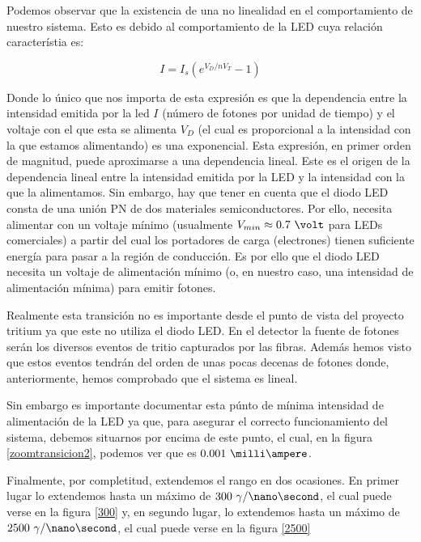 Podemos observar que la existencia de una no linealidad en el comportamiento de nuestro sistema. Esto es debido al comportamiento de la LED cuya relación característia es:

\begin{equation}
I=I_s(e^{V_D/{nV_T}}-1)
\label{LED}
\end{equation}

Donde lo único que nos importa de esta expresión es que la dependencia entre la intensidad emitida por la led $I$ (número de fotones por unidad de tiempo) y el voltaje con el que esta se alimenta $V_D$ (el cual es proporcional a la intensidad con la que estamos alimentando) es una exponencial. Esta expresión, en primer orden de magnitud, puede aproximarse a una dependencia lineal. Este es el origen de la dependencia lineal entre la intensidad emitida por la LED y la intensidad con la que la alimentamos. Sin embargo, hay que tener en cuenta que el diodo LED consta de una unión PN de dos materiales semiconductores. Por ello, necesita alimentar con un voltaje mínimo (usualmente $V_{min}\approx 0.7~\volt$ para LEDs comerciales) a partir del cual los portadores de carga (electrones) tienen suficiente energía para pasar a la región de conducción. Es por ello que el diodo LED necesita un voltaje de alimentación mínimo (o, en nuestro caso, una intensidad de alimentación  mínima) para emitir fotones.

Realmente esta transición no es importante desde el punto de vista del proyecto tritium ya que este no utiliza el diodo LED. En el detector la fuente de fotones serán los diversos eventos de tritio capturados por las fibras. Además hemos visto que estos eventos tendrán del orden de unas pocas decenas de fotones donde, anteriormente, hemos comprobado que el sistema es lineal. 

Sin embargo es importante documentar esta púnto de mínima intensidad de alimentación de la LED ya que, para asegurar el correcto funcionamiento del sistema, debemos situarnos por encima de este punto, el cual, en la figura \ref{zoomtransicion2}, podemos ver que es $0.001~\milli\ampere$.

Finalmente, por completitud, extendemos el rango en dos ocasiones. En primer lugar lo extendemos hasta un máximo de $300~\gamma/\nano\second$, el cual puede verse en la figura \ref{300} y, en segundo lugar, lo extendemos hasta un máximo de $2500~\gamma/\nano\second$, el cual puede verse en la figura \ref{2500}

